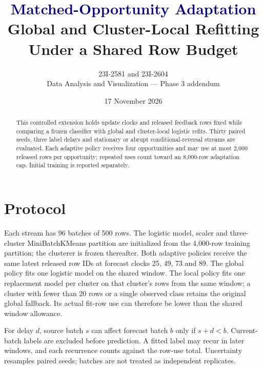 \documentclass[10pt]{article}
\title{\textcolor{navy}{Matched-Opportunity Adaptation}\\[3pt]\large Global and Cluster-Local Refitting Under a Shared Row Budget}
\author{23I-2581 and 23I-2604\\Data Analysis and Visualization --- Phase 3 addendum}
\date{17 November 2026}
\begin{document}
\maketitle
\begin{abstract}
This controlled extension holds update clocks and released feedback rows fixed while comparing a frozen classifier with global and cluster-local logistic refits. Thirty paired seeds, three label delays and stationary or abrupt conditional-reversal streams are evaluated. Each adaptive policy receives four opportunities and may use at most 2,000 released rows per opportunity; repeated uses count toward an 8,000-row adaptation cap. Initial training is reported separately.
\end{abstract}
\section{Protocol}
Each stream has 96 batches of 500 rows. The logistic model, scaler and three-cluster MiniBatchKMeans partition are initialized from the 4,000-row training partition; the clusterer is frozen thereafter. Both adaptive policies receive the same latest released row IDs at forecast clocks 25, 49, 73 and 89. The global policy fits one logistic model on the shared window. The local policy fits one replacement model per cluster on that cluster's rows from the same window; a cluster with fewer than 20 rows or a single observed class retains the original global fallback. Its actual fit-row use can therefore be lower than the shared window allowance.

For delay $d$, source batch $s$ can affect forecast batch $b$ only if $s+d<b$. Current-batch labels are excluded before prediction. A fitted label may recur in later windows, and each recurrence counts against the row-use total. Uncertainty resamples paired seeds; batches are not treated as independent replicates.
\end{document}
